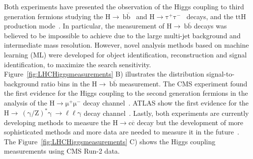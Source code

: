 Both experiments have presented the observation of the Higgs coupling to third generation fermions studying the $\mathrm{H\rightarrow~b\overline{b}}$~\cite{atlasrun2_hbb,cmsrun2_hbb} and $\mathrm{H\rightarrow\tau^{+}\tau^{-}}$~\cite{atlasrun2_htautau,cmsrun2_htautau} decays, and the $\mathrm{ttH}$ production mode~\cite{atlasrun2_tth,cmsrun2_tth}. In particular, the measurement of $\mathrm{H\rightarrow~b\overline{b}}$ decays was believed to be impossible to achieve due to the large multi-jet background and intermediate mass resolution. However, novel analysis methods based on machine learning (ML) were developed for object identification, reconstruction and signal identification, to maximize the search sensitivity. Figure~\ref{fig:LHCHiggsmeasurements} B) illustrates the distribution signal-to-background ratio bins in the $\mathrm{H\rightarrow~b\overline{b}}$ measurement. The CMS experiment found the first evidence for the Higgs coupling to the second generation fermions in the analysis of the $\mathrm{H\rightarrow\mu^{+}\mu^{-}}$ decay channel~\cite{cmsrun2_hmumu}. ATLAS show the first evidence for the $\mathrm{H\rightarrow~(\gamma/Z)^{*}\gamma~\rightarrow\ell\ell\gamma}$ decay channel~\cite{atlasrun2_h_zgamma}. Lastly, both experiments are currently developing methods to measure the $\mathrm{H\rightarrow c\overline{c}}$ decay but the development of more sophisticated methods and more data are needed to measure it in the future~\cite{atlasrun2_hcc,cmsrun2_hcc}. The Figure~\ref{fig:LHCHiggsmeasurements} C) shows the Higgs coupling measurements using CMS Run-2 data.
